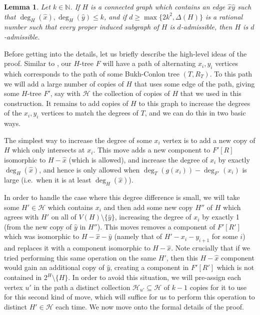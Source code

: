 \documentclass[12pt,letterpaper]{article}
\newtheorem{lemma}[theorem]{Lemma}
\theoremstyle{definition}
\renewcommand{\c}[1]{\mathcal{#1}}
\newcommand{\sm}{\setminus}
\newcommand{\sub}{\subseteq}
\begin{document}
	\begin{lemma}\label{lemma arbitrary edge admissible}
		Let $k\in\mathbb{N}$. If $H$ is a connected graph which contains an edge $\hat{x}\hat{y}$ such that $\deg_{H}(\hat{x}),\deg_H(\hat{y})\le k$, and if $d\ge \max\{2k^2,\Delta(H)\}$ is a rational number such that every proper induced subgraph of $H$ is $d$-admissible, then $H$ is $d$-admissible.
	\end{lemma}
	
	Before getting into the details, let us briefly describe the high-level ideas of the proof.  Similar to , our $H$-tree $F$ will have a path of alternating $x_i,y_i$ vertices which corresponds to the path of some Bukh-Conlon tree $(T,R_T)$.  To this path we will add a large number of copies of $H$ that uses some edge of the path, giving some $H$-tree $F'$, say with $\c{H}$ the collection of copies of $H$ that we used in this construction. It remains to add copies of $H$ to this graph to increase the degrees of the $x_i,y_i$ vertices to match the degrees of $T$, and we can do this in two basic ways.
	
	The simplest way to increase the degree of some $x_i$ vertex is to add a new copy of $H$ which only intersects at $x_i$.  This move adds a new component to $F'[R]$ isomorphic to $H-\hat{x}$ (which is allowed), and increase the degree of $x_i$ by exactly $\deg_H(\hat{x})$, and hence is only allowed when $\deg_T(g(x_i))-\deg_{F'}(x_i)$ is large (i.e.\ when it is at least $\deg_H(\hat{x})$).  
	
	In order to handle the case where this degree difference is small, we will take some $H'\in \c{H}$ which contains $x_i$ and then add some new copy $H''$ of $H$ which agrees with $H'$ on all of $V(H)\sm \{\hat{y}\}$, increasing the degree of $x_i$ by exactly 1 (from the new copy of $\hat{y}$ in $H''$).  This moves removes a component of $F'[R']$ which was isomorphic to $H-\hat{x}-\hat{y}$ (namely that of $H'-x_i-y_{i+1}$ for some $i$) and replaces it with a component isomorphic to $H-\hat{x}$.  Note crucially that if we tried performing this same operation on the same $H'$, then this $H-\hat{x}$ component would gain an additional copy of $\hat{y}$, creating a component in $F'[R']$ which is not contained in $2^H\sm \{H\}$.  In order to avoid this situation, we will pre-assign each vertex $u'$ in the path a distinct collection $\c{H}_{u'}\sub \c{H}$ of $k-1$ copies for it to use for this second kind of move, which will suffice for us to perform this operation to distinct $H'\in \c{H}$ each time.  We now move onto the formal details of the proof.
	
\end{document}
